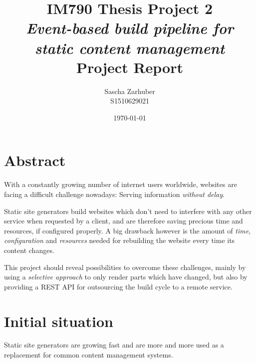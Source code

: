 \documentclass[a4paper,english,11pt]{report}
\author{Sascha Zarhuber\\ S1510629021}
\title{IM790 Thesis Project 2\\ \emph{Event-based build pipeline for static content management}\\ Project Report}
\date{\today}
\begin{document}
\maketitle
\tableofcontents

\chapter*{Abstract} %

With a constantly growing number of internet users worldwide, websites are facing a difficult challenge nowadays: Serving information \emph{without delay}.

Static site generators build websites which don't need to interfere with any other service when requested by a client, and are therefore saving precious time and resources, if configured properly. A big drawback however is the amount of \emph{time}, \emph{configuration} and \emph{resources} needed for rebuilding the website every time its content changes.

This project should reveal possibilities to overcome these challenges, mainly by using a \emph{selective approach} to only render parts which have changed, but also by providing a REST API for outsourcing the build cycle to a remote service.


\chapter{Initial situation}

Static site generators are growing fast and are more and more used as a replacement for common content management systems.
\end{document}
